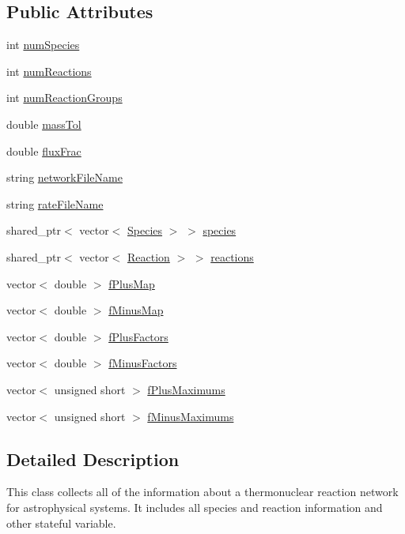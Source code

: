 \subsection*{Public Attributes}
\begin{DoxyCompactItemize}
\item 
int \hyperlink{a00023_a17ffe8399181590d59d3d339ce867709}{num\+Species}
\item 
int \hyperlink{a00023_ade8f4d9aa1524cbc45809e7943725d59}{num\+Reactions}
\item 
int \hyperlink{a00023_a91f7685b58b70eca227a098717dfe2c5}{num\+Reaction\+Groups}
\item 
double \hyperlink{a00023_ad3d95ecac758ca7efce6376904455123}{mass\+Tol}
\item 
double \hyperlink{a00023_a0bb068c675589e1ad767c1faf2165ed7}{flux\+Frac}
\item 
string \hyperlink{a00023_abcc4209749ecd64d0ab9621210536ade}{network\+File\+Name}
\item 
string \hyperlink{a00023_abb5fbb289b2e40d3b3dcb3695696e2c2}{rate\+File\+Name}
\item 
shared\+\_\+ptr$<$ vector$<$ \hyperlink{a00028}{Species} $>$ $>$ \hyperlink{a00023_ac3811889f4866a29a49ce3a8d0e80cad}{species}
\item 
shared\+\_\+ptr$<$ vector$<$ \hyperlink{a00022}{Reaction} $>$ $>$ \hyperlink{a00023_a32964b6f6a9cb312e722c1478167b7f0}{reactions}
\item 
vector$<$ double $>$ \hyperlink{a00023_af3aa4184f759b2a8babf765667aa6604}{f\+Plus\+Map}
\item 
vector$<$ double $>$ \hyperlink{a00023_a9065be108e95b1604b0d53e2080f0b57}{f\+Minus\+Map}
\item 
vector$<$ double $>$ \hyperlink{a00023_aca9928041359ecf555a63e4f58e80164}{f\+Plus\+Factors}
\item 
vector$<$ double $>$ \hyperlink{a00023_a3aff20108c80e14f9f4d526a08af49de}{f\+Minus\+Factors}
\item 
vector$<$ unsigned short $>$ \hyperlink{a00023_a6682680b1f2975fa8dc1288d3c463693}{f\+Plus\+Maximums}
\item 
vector$<$ unsigned short $>$ \hyperlink{a00023_a4ea51dc9d41bf555592f93bb237e0440}{f\+Minus\+Maximums}
\end{DoxyCompactItemize}


\subsection{Detailed Description}
This class collects all of the information about a thermonuclear reaction network for astrophysical systems. It includes all species and reaction information and other stateful variable.

